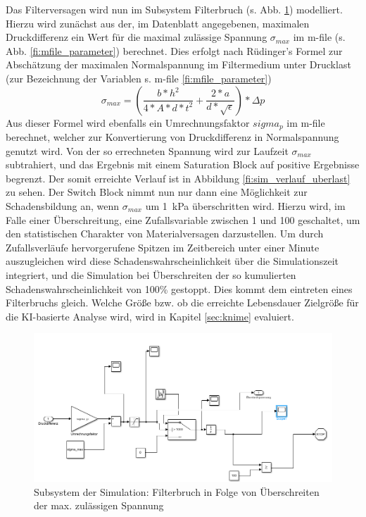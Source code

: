     Das Filterversagen wird nun im Subsystem Filterbruch (s. Abb. \ref{fi:sim_filterbruch}) modelliert. Hierzu wird zunächst aus der, im Datenblatt angegebenen, maximalen Druckdifferenz ein Wert für die maximal zulässige Spannung $\sigma_{max}$ im m-file (s. Abb. \ref{fi:mfile_parameter}) berechnet. Dies erfolgt nach Rüdinger's Formel zur Abschätzung der maximalen Normalspannung im Filtermedium unter Drucklast \cite{rudinger} (zur Bezeichnung der Variablen s. m-file \ref{fi:mfile_parameter})
    \[
    \sigma_{max} = (\frac{b*h^2}{4*A*d*t^2}+\frac{2*a}{d*\sqrt{\epsilon}})*\Delta p
    \]
    Aus dieser Formel wird ebenfalls ein Umrechnungsfaktor $sigma_p$ im m-file berechnet, welcher zur Konvertierung von Druckdifferenz in Normalspannung genutzt wird. Von der so errechneten Spannung wird zur Laufzeit $\sigma_{max}$ subtrahiert, und das Ergebnis mit einem Saturation Block auf positive Ergebnisse begrenzt. Der somit erreichte Verlauf ist in Abbildung \ref{fi:sim_verlauf_uberlast} zu sehen. Der Switch Block nimmt nun nur dann eine Möglichkeit zur Schadensbildung an, wenn $\sigma_{max}$ um \SI{1}{\kilo\pascal} überschritten wird. Hierzu wird, im Falle einer Überschreitung, eine Zufallsvariable zwischen 1 und 100 geschaltet, um den statistischen Charakter von Materialversagen darzustellen. Um durch Zufallsverläufe hervorgerufene Spitzen im Zeitbereich unter einer Minute auszugleichen wird diese Schadenswahrscheinlichkeit über die Simulationszeit integriert, und die Simulation bei Überschreiten der so kumulierten Schadenswahrscheinlichkeit von 100\% gestoppt. Dies kommt dem eintreten eines Filterbruchs gleich.
    Welche Größe bzw. ob die erreichte Lebensdauer Zielgröße für die KI-basierte Analyse wird, wird in Kapitel \ref{sec:knime} evaluiert.
    \begin{figure}[H]
        \begin{center}
            \includegraphics[width=\linewidth]{images/sim_filterbruch.png}
            \caption[Subsystem Filterbruch]{Subsystem der Simulation: Filterbruch in Folge von Überschreiten der max. zulässigen Spannung}
            \label{fi:sim_filterbruch}
        \end{center}
    \end{figure}
